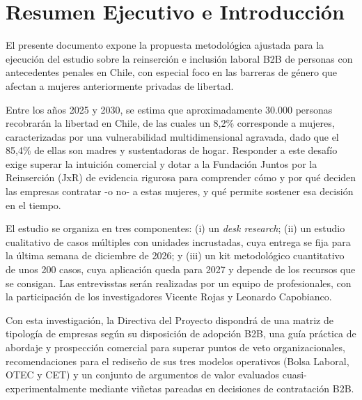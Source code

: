 \section{Resumen Ejecutivo e Introducción}

El presente documento expone la propuesta metodológica ajustada para la ejecución del estudio sobre la reinserción e inclusión laboral B2B de personas con antecedentes penales en Chile, con especial foco en las barreras de género que afectan a mujeres anteriormente privadas de libertad.

Entre los años 2025 y 2030, se estima que aproximadamente 30.000 personas recobrarán la libertad en Chile, de las cuales un 8,2\% corresponde a mujeres, caracterizadas por una vulnerabilidad multidimensional agravada, dado que el 85,4\% de ellas son madres y sustentadoras de hogar. \parencite{CaracterizacionPersonasPrivadas2026} Responder a este desafío exige superar la intuición comercial y dotar a la Fundación Juntos por la Reinserción (JxR) de evidencia rigurosa para comprender cómo y por qué deciden las empresas contratar -o no- a estas mujeres, y qué permite sostener esa decisión en el tiempo.

El estudio se organiza en tres componentes: (i) un \textit{desk research}; (ii) un estudio cualitativo de casos múltiples con unidades incrustadas, cuya entrega se fija para la última semana de diciembre de 2026; y (iii) un kit metodológico cuantitativo de unos 200 casos, cuya aplicación queda para 2027 y depende de los recursos que se consigan. Las entrevisstas serán realizadas por un equipo de profesionales, con la participación de los investigadores Vicente Rojas y Leonardo Capobianco.

Con esta investigación, la Directiva del Proyecto dispondrá de una matriz de tipología de empresas según su disposición de adopción B2B, una guía práctica de abordaje y prospección comercial para superar puntos de veto organizacionales, recomendaciones para el rediseño de sus tres modelos operativos (Bolsa Laboral, OTEC y CET) y un conjunto de argumentos de valor evaluados cuasi-experimentalmente mediante viñetas pareadas en decisiones de contratación B2B.
